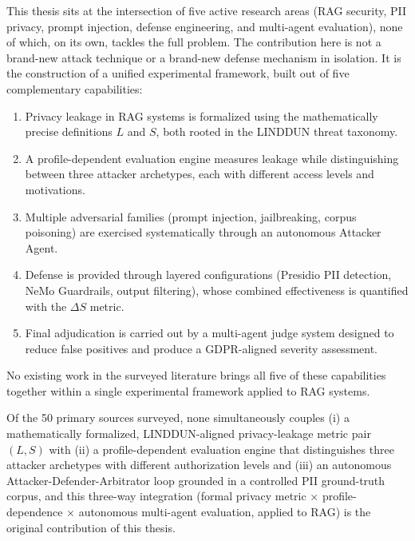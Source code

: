 \documentclass[12pt, a4paper]{report}
\begin{document}
\begin{notebox}
This thesis sits at the intersection of five active research areas (RAG security, PII privacy, prompt injection, defense engineering, and multi-agent evaluation), none of which, on its own, tackles the full problem. The contribution here is not a brand-new attack technique or a brand-new defense mechanism in isolation. It is the construction of a unified experimental framework, built out of five complementary capabilities:

\begin{enumerate}[leftmargin=1.5em, itemsep=3pt]
  \item Privacy leakage in RAG systems is formalized using the mathematically precise definitions $L$ and $S$, both rooted in the LINDDUN threat taxonomy.
  \item A profile-dependent evaluation engine measures leakage while distinguishing between three attacker archetypes, each with different access levels and motivations.
  \item Multiple adversarial families (prompt injection, jailbreaking, corpus poisoning) are exercised systematically through an autonomous Attacker Agent.
  \item Defense is provided through layered configurations (Presidio PII detection, NeMo Guardrails, output filtering), whose combined effectiveness is quantified with the $\Delta S$ metric.
  \item Final adjudication is carried out by a multi-agent judge system designed to reduce false positives and produce a GDPR-aligned severity assessment.
\end{enumerate}

No existing work in the surveyed literature brings all five of these capabilities together within a single experimental framework applied to RAG systems.
\end{notebox}

\begin{transitionbox}
Of the 50 primary sources surveyed, none simultaneously couples (i) a mathematically formalized, LINDDUN-aligned privacy-leakage metric pair $(L, S)$ with (ii) a profile-dependent evaluation engine that distinguishes three attacker archetypes with different authorization levels and (iii) an autonomous Attacker-Defender-Arbitrator loop grounded in a controlled PII ground-truth corpus, and this three-way integration (formal privacy metric $\times$ profile-dependence $\times$ autonomous multi-agent evaluation, applied to RAG) is the original contribution of this thesis.
\end{transitionbox}
\end{document}

